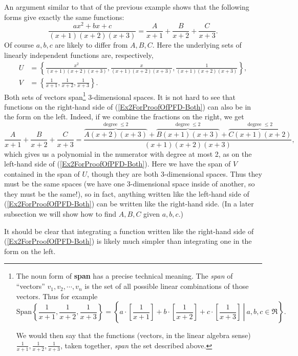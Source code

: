 \bex An argument similar to that of the previous example shows that
the following forms give exactly the same functions:
\begin{equation}\frac{ax^2+bx+c}{(x+1)(x+2)(x+3)}=\frac{A}{x+1}+
\frac{B}{x+2}+\frac{C}{x+3}.\label{Ex2ForProofOfPFD-Both}
\end{equation}
Of course $a,b,c$ are likely to differ from $A,B,C$.  Here the
underlying sets of linearly independent functions are, respectively,
\begin{align*}U&=\left\{\frac{x^2}{(x+1)(x+2)(x+3)}, 
           \frac{x}{(x+1)(x+2)(x+3)},
           \frac{1}{(x+1)(x+2)(x+3)}\right\},\\
              V&=\left\{\frac1{x+1},\frac1{x+2},\frac1{x+3}\right\}.
\end{align*}
Both sets of vectors span\footnote{%
The noun form of {\bf span} has a precise technical meaning.  The {\it span}
of ``vectors'' $v_1,v_2,\cdots,v_n$ is the set of all possible
linear combinations of those vectors.  Thus for example
$$\text{Span}\left\{\frac1{x+1},\frac1{x+2},\frac1{x+3}\right\}
=\left\{\left.a\cdot\left[\frac1{x+1}\right]+b\cdot\left[\frac1{x+2}\right]
        +c\cdot\left[\frac1{x+3}\right]\ \right| \ a,b,c\in\Re\right\}.$$

We would then say that the functions (vectors, in the linear algebra sense)
$\frac1{x+1},\frac1{x+2},\frac1{x+3}$, taken together, {\it span} 
the set described above.
} 3-dimensional spaces.
It is not hard to see that functions on the right-hand side of
(\ref{Ex2ForProofOfPFD-Both}) can also be in the form on the left.
Indeed, if we combine the fractions on the right, we get
$$\frac{A}{x+1}+\frac{B}{x+2}+\frac{C}{x+3}
=\frac{\overbrace{A(x+2)(x+3)}^{\text{degree }\le2}+
        \overbrace{B(x+1)(x+3)}^{\text{degree }\le2}
        +\overbrace{C(x+1)(x+2)}^{\text{degree }\le2}}
      {(x+1)(x+2)(x+3)},$$
which gives us a polynomial in the numerator with degree
at most 2, as on the left-hand side of (\ref{Ex2ForProofOfPFD-Both}).
Here we have the span of $V$ contained in the span of $U$,
though they are both 3-dimensional spaces.  Thus they must be
the same spaces (we have one 3-dimensional space inside of another,
so they must be the same!), so in fact, anything written like
the left-hand side of (\ref{Ex2ForProofOfPFD-Both})
can be written like the right-hand side.  (In a later subsection
we will show how to find $A,B,C$ given $a,b,c$.)

It should be clear that integrating a function written like the
right-hand side of (\ref{Ex2ForProofOfPFD-Both}) is likely much simpler 
than integrating one in the form on the left.
\eex

